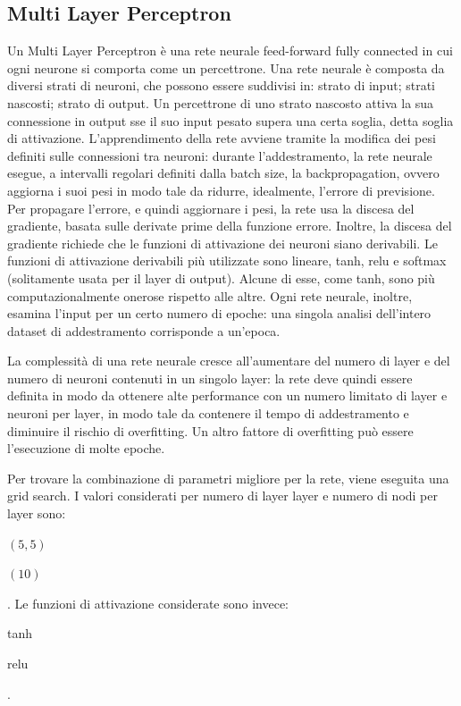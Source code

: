 \subsection{Multi Layer Perceptron}
Un Multi Layer Perceptron è una rete neurale feed-forward fully connected in cui 
ogni neurone si comporta come un percettrone. Una rete neurale è composta
da diversi strati di neuroni, che possono essere suddivisi in: strato di input;
strati nascosti; strato di output.
Un percettrone di uno strato nascosto attiva la sua connessione in output
sse il suo input pesato supera una certa soglia, detta soglia di attivazione.
L'apprendimento della rete avviene tramite la modifica dei pesi definiti
sulle connessioni tra neuroni: durante l'addestramento, la rete neurale esegue,
a intervalli regolari definiti dalla batch size, la backpropagation, ovvero
aggiorna i suoi pesi in modo tale da ridurre, idealmente, l'errore di previsione.
Per propagare l'errore, e quindi aggiornare i pesi, la rete usa la discesa del
gradiente, basata sulle derivate prime della funzione errore. Inoltre,
la discesa del gradiente richiede che le funzioni di attivazione dei neuroni
siano derivabili.
Le funzioni di attivazione derivabili più utilizzate sono lineare, tanh, relu
e softmax (solitamente usata per il layer di output). Alcune di esse, come tanh,
sono più computazionalmente onerose rispetto alle altre.
Ogni rete neurale, inoltre, esamina l'input per un certo numero di epoche:
una singola analisi dell'intero dataset di addestramento corrisponde a un'epoca.

La complessità di una rete neurale cresce
all'aumentare del numero di layer e del numero di neuroni contenuti in un
singolo layer: la rete deve quindi
essere definita in modo da ottenere alte performance con un numero limitato
di layer e neuroni per layer, in modo tale da contenere il tempo di addestramento
e diminuire il rischio di overfitting.
Un altro fattore di overfitting può essere l'esecuzione di molte epoche.

Per trovare la combinazione di parametri migliore per la rete, viene eseguita 
una grid search. 
I valori considerati per numero di layer layer e numero di nodi per layer sono:
\begin{itemize*}
    \item $(5, 5)$
    \item $(10)$
\end{itemize*}.
Le funzioni di attivazione considerate sono invece: \begin{itemize*}
    \item tanh
    \item relu
\end{itemize*}.

